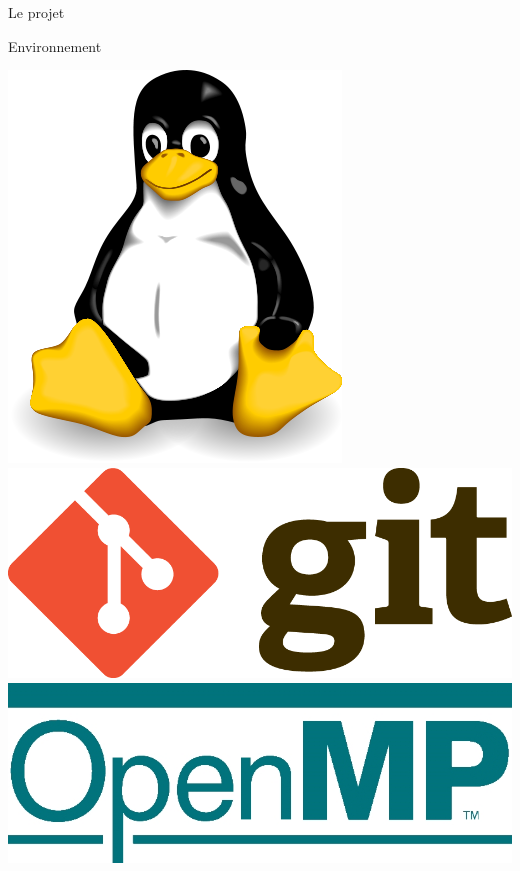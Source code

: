 \documentclass[compress,pdf,11pt,xcolor=dvipsnames]{beamer}
\begin{document}
\begin{frame}{Le projet}
  \begin{greyblock}{Environnement}
    \begin{center}
      \includegraphics[scale=0.1]{img/linux}
      \hspace{3mm}
      \includegraphics[scale=0.3]{img/git}
      \hspace{3mm}
      \includegraphics[scale=0.1]{img/openmp}
      \hspace{3mm}

\end{center}
\end{greyblock}
\end{frame}
\end{document}
